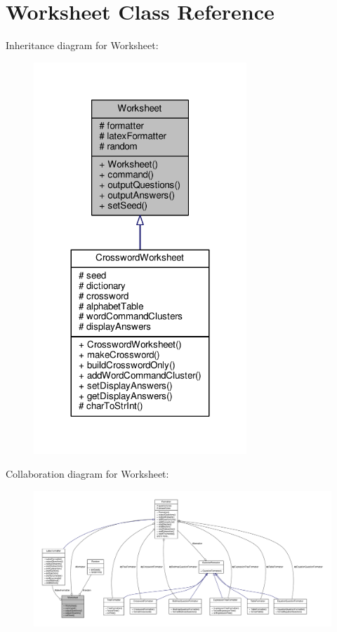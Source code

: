 \hypertarget{classWorksheet}{}\section{Worksheet Class Reference}
\label{classWorksheet}


Inheritance diagram for Worksheet\+:
\nopagebreak
\begin{figure}[H]
\begin{center}
\leavevmode
\includegraphics[width=227pt]{classWorksheet__inherit__graph}
\end{center}
\end{figure}


Collaboration diagram for Worksheet\+:
\nopagebreak
\begin{figure}[H]
\begin{center}
\leavevmode
\includegraphics[width=350pt]{classWorksheet__coll__graph}
\end{center}
\end{figure}
